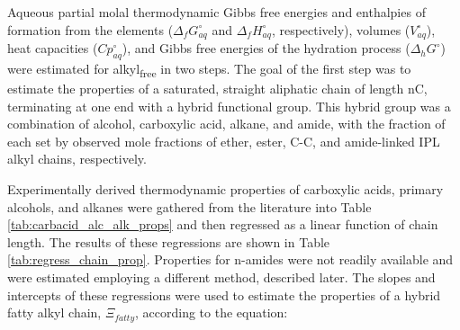 Aqueous partial molal thermodynamic Gibbs free energies and enthalpies of formation from the elements ($\Delta_{f}G_{aq}^{\circ}$ and $\Delta_{f}H_{aq}^{\circ}$, respectively), volumes ($V_{aq}^{\circ}$), heat capacities ($Cp_{aq}^{\circ}$), and Gibbs free energies of the hydration process ($\Delta_{h}G^{\circ}$) were estimated for alkyl\textsubscript{free} in two steps. The goal of the first step was to estimate the properties of a saturated, straight aliphatic chain of length nC, terminating at one end with a hybrid functional group. This hybrid group was a combination of alcohol, carboxylic acid, alkane, and amide, with the fraction of each set by observed mole fractions of ether, ester, C-C, and amide-linked IPL alkyl chains, respectively. 

Experimentally derived thermodynamic properties of carboxylic acids, primary alcohols, and alkanes were gathered from the literature into Table \ref{tab:carbacid_alc_alk_props} and then regressed as a linear function of chain length. The results of these regressions are shown in Table \ref{tab:regress_chain_prop}. Properties for n-amides were not readily available and were estimated employing a different method, described later.
The slopes and intercepts of these regressions were used to estimate the properties of a hybrid fatty alkyl chain, $\Xi_{fatty}$, according to the equation:

